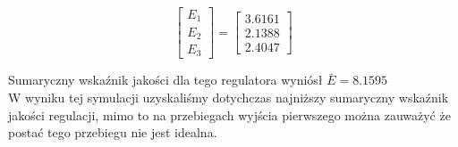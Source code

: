 \[
\begin{bmatrix}
    E_{\mathrm{1}} \\
    E_{\mathrm{2}} \\
    E_{\mathrm{3}} 
\end{bmatrix}
= 
\begin{bmatrix}
    \num{3.6161} \\
    \num{2.1388} \\
    \num{2.4047}
\end{bmatrix}
\]

Sumaryczny wskaźnik jakości dla tego regulatora wyniósł $\bar{E} = \num{8.1595}$\\

W wyniku tej symulacji uzyskaliśmy dotychczas najniższy sumaryczny wskaźnik jakości regulacji, 
mimo to na przebiegach wyjścia pierwszego można zauważyć że postać tego przebiegu nie jest 
idealna. 


